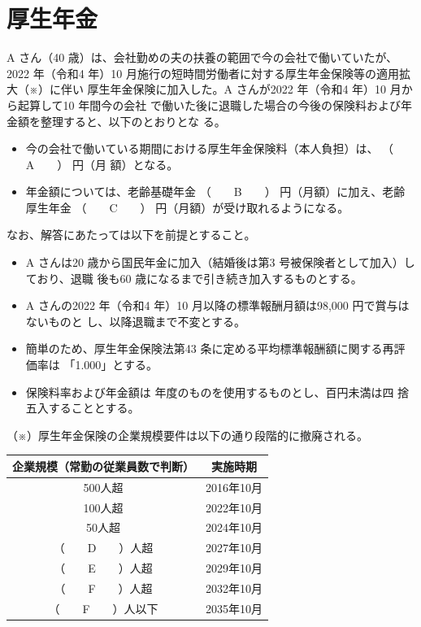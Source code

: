 \section{厚生年金}

\begin{fillblank}[年金1 2022 問題1(5) ア 改題]
  A さん（40 歳）は、会社勤めの夫の扶養の範囲で今の会社で働いていたが、2022 年（令和4
年）10 月施行の短時間労働者に対する厚生年金保険等の適用拡大（※）に伴い
厚生年金保険に加入した。A さんが2022 年（令和4 年）10 月から起算して10 年間今の会社
で働いた後に退職した場合の今後の保険料および年金額を整理すると、以下のとおりとな
る。
\begin{itemize}
  \item 今の会社で働いている期間における厚生年金保険料（本人負担）は、 （　　A　　） 円（月
額）となる。
  \item 年金額については、老齢基礎年金 （　　B　　） 円（月額）に加え、老齢厚生年金 （　　C　　）
円（月額）が受け取れるようになる。
\end{itemize}



なお、解答にあたっては以下を前提とすること。
\begin{itemize}
  \item A さんは20 歳から国民年金に加入（結婚後は第3 号被保険者として加入）しており、退職
後も60 歳になるまで引き続き加入するものとする。
  \item A さんの2022 年（令和4 年）10 月以降の標準報酬月額は98,000 円で賞与はないものと
し、以降退職まで不変とする。
  \item 簡単のため、厚生年金保険法第43 条に定める平均標準報酬額に関する再評価率は
「1.000」とする。
  \item 保険料率および年金額は \warekiyear 年度のものを使用するものとし、百円未満は四
捨五入することとする。
\end{itemize}

（※）厚生年金保険の企業規模要件は以下の通り段階的に撤廃される。

\begin{table}[htbp]
    \centering
    \begin{tabular}{|c|c|} \hline 
      企業規模（常勤の従業員数で判断） &  実施時期 \\ \hline
      500人超 & 2016年10月 \\ \hline
      100人超 & 2022年10月 \\ \hline
      50人超 & 2024年10月 \\ \hline
      （　　D　　）人超 & 2027年10月 \\ \hline
      （　　E　　）人超 & 2029年10月 \\ \hline
      （　　F　　）人超 & 2032年10月 \\ \hline
      （　　F　　）人以下 & 2035年10月 \\ \hline
    \end{tabular}
  \end{table}


\end{fillblank}

